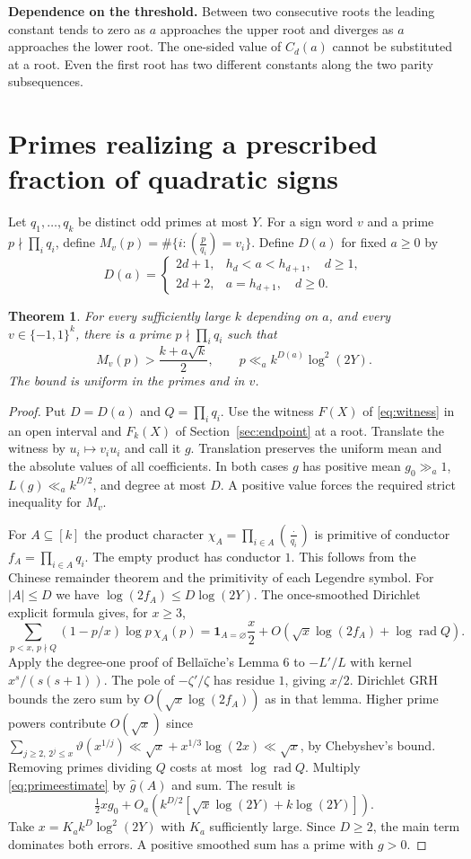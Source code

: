 \documentclass[11pt,letterpaper]{article}
\theoremstyle{research}
\newtheorem{theorem}{Theorem}\newtheorem{lemma}[theorem]{Lemma}
\newcommand{\rad}{\operatorname{rad}}
\newcommand{\ind}{\mathbf 1}
\newcommand{\sect}[1]{\section{\texorpdfstring{\color{ink}#1}{#1}}}
\begin{document}
\textbf{Dependence on the threshold.}
Between two consecutive roots the leading constant tends to zero as $a$
approaches the upper root and diverges as $a$ approaches the lower root.
The one-sided value of $C_d(a)$ cannot be substituted at a root. Even the
first root has two different constants along the two parity subsequences.
\clearpage
\sect{Primes realizing a prescribed fraction of quadratic signs}
Let $q_1,\ldots,q_k$ be distinct odd primes at most $Y$.
For a sign word $v$ and a prime $p\nmid \prod_i q_i$, define
$M_v(p)=\#\{i:(\frac{p}{q_i})=v_i\}$. Define $D(a)$ for fixed $a\ge0$ by
\[
 D(a)=
 \begin{cases}2d+1,& h_d<a<h_{d+1},\quad d\ge1,\\
               2d+2,& a=h_{d+1},\quad d\ge0 .
 \end{cases}
\]
\begin{theorem}\label{th:prime}
For every sufficiently large $k$ depending on $a$, and every $v\in\{-1,1\}^k$,
there is a prime $p\nmid\prod_i q_i$ such that
\[
 M_v(p)>\frac{k+a\sqrt k}{2},\qquad
 p\ll_a k^{D(a)}\log^2(2Y).
\]
The bound is uniform in the primes and in $v$.
\end{theorem}
\begin{proof}
Put $D=D(a)$ and $Q=\prod_i q_i$. Use the witness $F(X)$ of
\eqref{eq:witness} in an open interval and $F_k(X)$ of
Section~\ref{sec:endpoint} at a root. Translate the witness by $u_i\mapsto
v_i u_i$ and call it $g$. Translation preserves the uniform mean and the
absolute values of all coefficients. In both cases $g$ has positive mean
$g_0\gg_a 1$, $L(g)\ll_a k^{D/2}$, and degree at most $D$.
A positive value forces the required strict inequality for $M_v$.

For $A\subseteq[k]$ the product character $\chi_A=\prod_{i\in A}
(\frac{\cdot}{q_i})$ is primitive of conductor $f_A=\prod_{i\in A}q_i$.
The empty product has conductor $1$. This follows from the Chinese
remainder theorem and the primitivity of each Legendre symbol. For
$|A|\le D$ we have $\log(2f_A)\le D\log(2Y)$. The once-smoothed Dirichlet
explicit formula gives, for $x\ge3$,
\begin{equation}\label{eq:primeestimate}
\sum_{p<x,\,p\nmid Q}(1-p/x)\log p\,\chi_A(p)
 =\ind_{A=\varnothing}\frac x2+
 O\!\left(\sqrt x\log(2f_A)+\log\rad Q\right).
\end{equation}
Apply the degree-one proof of Bella\"iche's Lemma 6
\cite{bellaiche} to $-L'/L$ with kernel $x^{s}/(s(s+1))$.
The pole of $-\zeta'/\zeta$ has residue $1$, giving $x/2$.
Dirichlet GRH bounds the zero sum by $O(\sqrt x\log(2f_A))$ as in that
lemma. Higher prime powers contribute $O(\sqrt x)$ since
$\sum_{j\ge2,\,2^j\le x}\vartheta(x^{1/j})\ll\sqrt x+x^{1/3}\log(2x)\ll\sqrt x$,
by Chebyshev's bound. Removing primes dividing $Q$ costs
at most $\log\rad Q$.
Multiply \eqref{eq:primeestimate} by $\widehat g(A)$ and sum. The result is
\[
  \tfrac12xg_0+O_a\!\left(k^{D/2}
       [\sqrt x\log(2Y)+k\log(2Y)]\right).
\]
Take $x=K_a k^D\log^2(2Y)$ with $K_a$ sufficiently large. Since $D\ge2$,
the main term dominates both errors. A positive smoothed sum has a prime
with $g>0$.
\end{proof}
\end{document}
